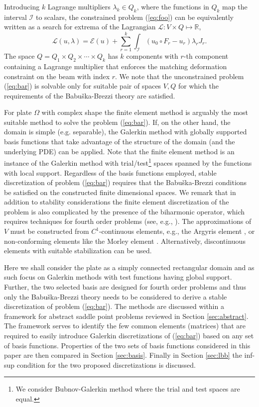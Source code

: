 \documentclass{marine_2015}
\begin{document}
Introducing $k$ Lagrange multipliers $\lambda_k\in Q_k$, where the functions in 
$Q_k$ map the interval $\mathcal{I}$ to scalars, the constrained problem 
(\ref{eq:foo}) can be equivalently written as a search for extrema of the Lagrangian
$\mathcal{L}:V\times Q\mapsto \mathbb{R}$,
\begin{equation}
  \label{eq:bar}
\mathcal{L}\left(u, \lambda\right) = \mathcal{E}\left(u\right) +
  \sum_{r=1}^k\int_{\mathcal{I}}\left(u_0\circ F_r - u_r\right)\lambda_r J_r.
\end{equation}
The space $Q=Q_1\times Q_2\times\cdots\times Q_k$ has $k$ components with $r$-th
component containing a Lagrange multiplier that enforces the matching deformation 
constraint on the beam with index $r$. We note that the unconstrained problem (\ref{eq:bar}) 
is solvable only for suitable pair of spaces $V, Q$ for which the requirements of the
Babu\v{s}ka-Brezzi \cite{babuska, brezzi} theory are satisfied.

For plate $\Omega$ with complex shape the finite element method is arguably 
the most suitable method to solve the problem (\ref{eq:bar}). If, on the other hand, the
domain is simple (e.g. separable), the Galerkin method with globally supported basis functions
that take advantage of the structure of the domain (and the underlying PDE) can 
be applied. Note that the finite element method is an instance of the Galerkin 
method with trial/test\footnote{We consider Bubnov-Galerkin method where the
trial and test spaces are equal.} spaces spanned by the functions with local support. 
Regardless of the basis functions employed, stable discretization of problem (\ref{eq:bar})
requires that the Babu\v{s}ka-Brezzi conditions be satisfied on the constructed
finite dimensional spaces. We remark that in addition to stability
considerations the finite element discretization of the problem is also complicated
by the presence of the biharmonic operator, which requires techniques for fourth order 
problems (see, e.g., \cite{brenner}). The approximations of $V$ must be constructed 
from $C^1$-continuous elements, e.g., the Argyris element \cite{argyris}, or non-conforming 
elements like the Morley element \cite{morley}. Alternatively, discontinuous elements with 
suitable stabilization \cite{brennerip} can be used. 

Here we shall consider the plate as a simply connected rectangular domain and as
such focus on Galerkin methods with test functions having global support.
Further, the two selected basis are designed for fourth order problems and thus 
only the Babu\v{s}ka-Brezzi theory needs to be considered to derive a stable
discretization of problem (\ref{eq:bar}). The methods are discussed within a
framework for abstract saddle point problems reviewed in Section
\ref{sec:abstract}. The framework serves to identify the few common
elements (matrices) that are required to easily introduce Galerkin discretizations of
(\ref{eq:bar}) based on any set of basis functions. Properties of the two sets of
basis functions considered in this paper are then compared in Section \ref{sec:basis}.
Finally in Section \ref{sec:lbb} the inf-sup condition for the two proposed
discretizations is discussed.
\end{document}
